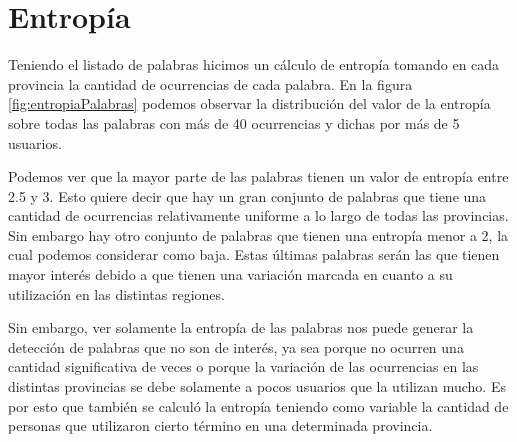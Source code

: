 





\section{Entropía}
Teniendo el listado de palabras hicimos un cálculo de entropía tomando en cada provincia la cantidad de ocurrencias de cada palabra. En la figura \ref{fig:entropiaPalabras} podemos observar la distribución del valor de la entropía sobre todas las palabras con más de 40 ocurrencias y dichas por más de 5 usuarios.

Podemos ver que la mayor parte de las palabras tienen un valor de entropía entre 2.5 y 3. Esto quiere decir que hay un gran conjunto de palabras que tiene una cantidad de ocurrencias relativamente uniforme a lo largo de todas las provincias. Sin embargo hay otro conjunto de palabras que tienen una entropía menor a 2, la cual podemos considerar como baja. Estas últimas palabras serán las que tienen mayor interés debido a que tienen una variación marcada en cuanto a su utilización en las distintas regiones.

Sin embargo, ver solamente la entropía de las palabras nos puede generar la detección de palabras que no son de interés, ya sea porque no ocurren una cantidad significativa de veces o porque la variación de las ocurrencias en las distintas provincias se debe solamente a pocos usuarios que la utilizan mucho. Es por esto que también se calculó la entropía teniendo como variable la cantidad de personas que utilizaron cierto término en una determinada provincia.


